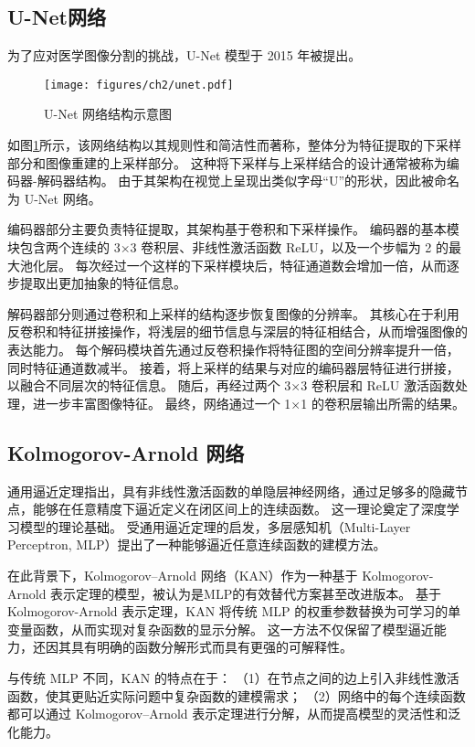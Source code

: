 \subsection{U-Net网络}
为了应对医学图像分割的挑战，U-Net 模型\cite{unet}于 2015 年被提出。
\begin{figure}
    \centering
    \texttt{[image: figures/ch2/unet.pdf]}
    \caption{U-Net 网络结构示意图}
    \label{img:unet}
\end{figure}

如图\ref{img:unet}所示，该网络结构以其规则性和简洁性而著称，整体分为特征提取的下采样部分和图像重建的上采样部分。
这种将下采样与上采样结合的设计通常被称为编码器-解码器结构。
由于其架构在视觉上呈现出类似字母“U”的形状，因此被命名为 U-Net 网络。

编码器部分主要负责特征提取，其架构基于卷积和下采样操作。
编码器的基本模块包含两个连续的 3×3 卷积层、非线性激活函数 ReLU，以及一个步幅为 2 的最大池化层。
每次经过一个这样的下采样模块后，特征通道数会增加一倍，从而逐步提取出更加抽象的特征信息。

解码器部分则通过卷积和上采样的结构逐步恢复图像的分辨率。
其核心在于利用反卷积和特征拼接操作，将浅层的细节信息与深层的特征相结合，从而增强图像的表达能力。
每个解码模块首先通过反卷积操作将特征图的空间分辨率提升一倍，同时特征通道数减半。
接着，将上采样的结果与对应的编码器层特征进行拼接，以融合不同层次的特征信息。
随后，再经过两个 3×3 卷积层和 ReLU 激活函数处理，进一步丰富图像特征。
最终，网络通过一个 1×1 的卷积层输出所需的结果。

\subsection{Kolmogorov-Arnold 网络}
通用逼近定理\cite{universal_approximation}指出，具有非线性激活函数的单隐层神经网络，通过足够多的隐藏节点，能够在任意精度下逼近定义在闭区间上的连续函数。
这一理论奠定了深度学习模型的理论基础。
受通用逼近定理的启发，多层感知机（Multi-Layer Perceptron, MLP）\cite{mlp}提出了一种能够逼近任意连续函数的建模方法。

在此背景下，Kolmogorov–Arnold 网络（KAN）\cite{kan}作为一种基于 Kolmogorov-Arnold 表示定理\cite{kan_theorem}的模型，被认为是MLP的有效替代方案甚至改进版本。
基于Kolmogorov-Arnold 表示定理，KAN 将传统 MLP 的权重参数替换为可学习的单变量函数，从而实现对复杂函数的显示分解。
这一方法不仅保留了模型逼近能力，还因其具有明确的函数分解形式而具有更强的可解释性。

与传统 MLP 不同，KAN 的特点在于：
（1）在节点之间的边上引入非线性激活函数，使其更贴近实际问题中复杂函数的建模需求；
（2）网络中的每个连续函数都可以通过 Kolmogorov–Arnold 表示定理进行分解，从而提高模型的灵活性和泛化能力。

